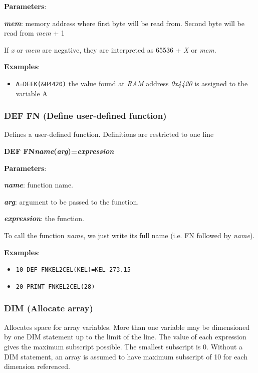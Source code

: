     \textbf{Parameters}:

    \hspace{1cm}\textbf{\textit{mem}}: memory address where first byte will be
    read from. Second byte will be read from \textit{mem} + 1

    If \textit{x} or \textit{mem} are negative, they are interpreted as 65536 +
    \textit{X} or \textit{mem}.

    \textbf{Examples}:
    \begin{itemize}
        \item \texttt{A=DEEK(\&H4420)} the value found at \textit{RAM} address
        \textit{0x4420} is assigned to the variable A
    \end{itemize}

    \subsubsection{{DEF FN (Define user-defined function)}}
    \label{msbasic:lang:deffn}
    Defines a user-defined function. Definitions are restricted to one line 

    \hspace{1.9cm}\textbf{DEF FN\textit{name}(\textit{arg})=\textit{expression}}

    \textbf{Parameters}:

    \hspace{1cm}\textbf{\textit{name}}: function name.

    \hspace{1cm}\textbf{\textit{arg}}: argument to be passed to the function.

    \hspace{1cm}\textbf{\textit{expression}}: the function.

    To call the function \textit{name}, we just write its full name (i.e. FN
    followed by \textit{name}).

    \textbf{Examples}:
    \begin{itemize}
        \item \texttt{10 DEF FNKEL2CEL(KEL)=KEL-273.15}
        \item \texttt{20 PRINT FNKEL2CEL(28)}
    \end{itemize}

    \subsubsection{{DIM (Allocate array)}}
    \label{msbasic:lang:dim}
    Allocates space for array variables. More than one variable may be
    dimensioned by one DIM statement up to the limit of the line. The value of
    each expression gives the maximum subscript possible. The smallest subscript
    is 0. Without a DIM statement, an array is assumed to have maximum subscript
    of 10 for each dimension referenced.

